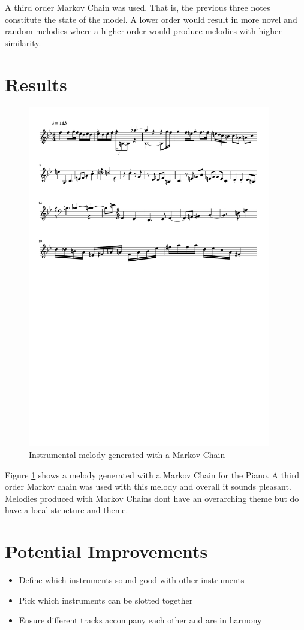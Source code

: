 A third order Markov Chain was used. That is, the previous three notes constitute the state of the model. A lower order would result in more novel and random melodies where a higher order would produce melodies with higher similarity.

\section{Results}
\begin{figure}
\centerline{\includegraphics[width=400px]{../images/instrumental_acousticgrand.pdf}}
\caption{Instrumental melody generated with a Markov Chain}
\label{ims:instrumentalmc}
\end{figure}

Figure \ref{ims:instrumentalmc} shows a melody generated with a Markov Chain for the Piano. A third order Markov chain was used with this melody and overall it sounds pleasant. Melodies produced with Markov Chains dont have an overarching theme but do have a local structure and theme.


\section{Potential Improvements}
\begin{itemize}
\item Define which instruments sound good with other instruments
\item Pick which instruments can be slotted together
\item Ensure different tracks accompany each other and are in harmony
\end{itemize}

